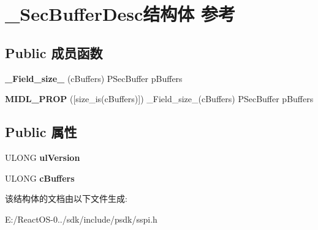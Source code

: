 \hypertarget{struct___sec_buffer_desc}{}\section{\+\_\+\+Sec\+Buffer\+Desc结构体 参考}
\label{struct___sec_buffer_desc}
\subsection*{Public 成员函数}
\begin{DoxyCompactItemize}
\item 
\mbox{\label{struct___sec_buffer_desc_af5c36d7743907875c8ccd95e10fcb678}} 
{\bfseries \+\_\+\+Field\+\_\+size\+\_\+} (c\+Buffers) P\+Sec\+Buffer p\+Buffers
\item 
\mbox{\label{struct___sec_buffer_desc_aac7760c27c00f0860d4284ee09967e83}} 
{\bfseries M\+I\+D\+L\+\_\+\+P\+R\+OP} (\mbox{[}size\+\_\+is(c\+Buffers)\mbox{]}) \+\_\+\+Field\+\_\+size\+\_\+(c\+Buffers) P\+Sec\+Buffer p\+Buffers
\end{DoxyCompactItemize}
\subsection*{Public 属性}
\begin{DoxyCompactItemize}
\item 
\mbox{\label{struct___sec_buffer_desc_a8d8fbc02f718a7785e5f050615a81d62}} 
U\+L\+O\+NG {\bfseries ul\+Version}
\item 
\mbox{\label{struct___sec_buffer_desc_a89e3ad416ec3994fe8fe3d07a034850d}} 
U\+L\+O\+NG {\bfseries c\+Buffers}
\end{DoxyCompactItemize}


该结构体的文档由以下文件生成\+:\begin{DoxyCompactItemize}
\item 
E\+:/\+React\+O\+S-\/0../sdk/include/psdk/sspi.\+h\end{DoxyCompactItemize}
